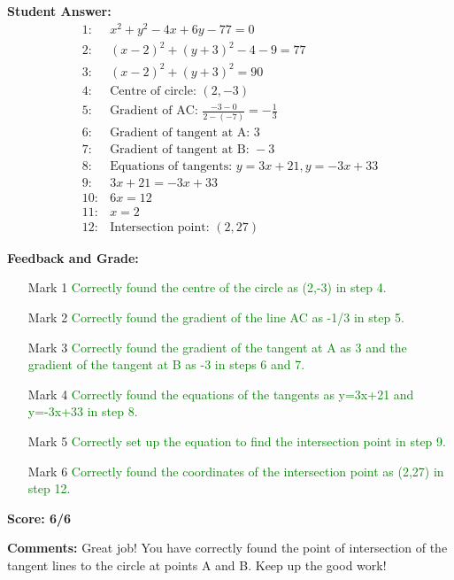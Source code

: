 \documentclass{article}
\begin{document}
\textbf{Student Answer:}
\begin{align*}
1: & x^2+y^2-4x+6y-77=0 \\
2: & (x-2)^2+(y+3)^2-4-9=77 \\
3: & (x-2)^2+(y+3)^2=90 \\
4: & \text{Centre of circle: } (2,-3) \\
5: & \text{Gradient of AC: } \frac{-3-0}{2-(-7)} = -\frac{1}{3} \\
6: & \text{Gradient of tangent at A: } 3 \\
7: & \text{Gradient of tangent at B: } -3 \\
8: & \text{Equations of tangents: } y=3x+21, y=-3x+33 \\
9: & 3x+21=-3x+33 \\
10: & 6x=12 \\
11: & x=2 \\
12: & \text{Intersection point: } (2,27)
\end{align*}

\textbf{Feedback and Grade:}
\begin{itemize}
\item[Mark 1] \textcolor{green}{Correctly found the centre of the circle as (2,-3) in step 4.}
\item[Mark 2] \textcolor{green}{Correctly found the gradient of the line AC as -1/3 in step 5.}
\item[Mark 3] \textcolor{green}{Correctly found the gradient of the tangent at A as 3 and the gradient of the tangent at B as -3 in steps 6 and 7.}
\item[Mark 4] \textcolor{green}{Correctly found the equations of the tangents as y=3x+21 and y=-3x+33 in step 8.}
\item[Mark 5] \textcolor{green}{Correctly set up the equation to find the intersection point in step 9.}
\item[Mark 6] \textcolor{green}{Correctly found the coordinates of the intersection point as (2,27) in step 12.}
\end{itemize}

\textbf{Score: 6/6}

\textbf{Comments:} Great job! You have correctly found the point of intersection of the tangent lines to the circle at points A and B. Keep up the good work!
\end{document}
